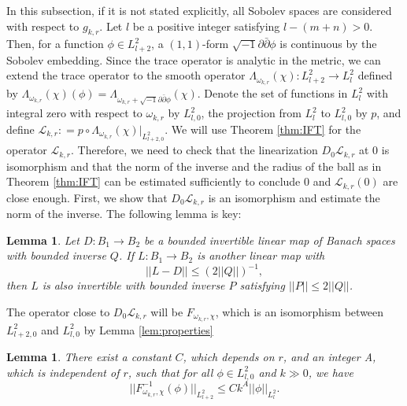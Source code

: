 \documentclass{amsart}
\numberwithin{equation}{section}
\theoremstyle{plain}
\newtheorem{lemma}[equation]{Lemma}
\theoremstyle{definition}
\theoremstyle{remark}
\begin{document}
In this subsection, if it is not stated explicitly, all Sobolev spaces are considered with respect to $g_{k,r}$. Let $l$ be a positive integer satisfying $l-(m+n) > 0$. Then, for a function $\phi \in L^2_{l+2}$,  a $(1,1)$-form $\sqrt{-1} \partial \bar{\partial} \phi$ is continuous by the Sobolev embedding. Since the trace operator is analytic in the metric, we can extend the trace operator to the smooth operator 
$\Lambda_{\omega_{k, r}}(\chi) : L^2_{l+2} \rightarrow L^2_l$ defined by 
$\Lambda_{\omega_{k, r}}(\chi)(\phi) = \Lambda_{\omega_{k, r} + \sqrt{-1} \partial \bar{\partial} \phi}(\chi)$.  
Denote the set of functions in $L^2_l$ with integral zero with respect to $\omega_{k,r}$ by $L^2_{l,0}$,  the projection from $L^2_l$ to $L^2_{l,0}$ by $p$, and define $\mathcal{L}_{k,r} : = p \circ \Lambda_{\omega_{k, r}}(\chi)|_{L^2_{l+2,0}}$.
We will use Theorem \ref{thm:IFT} for the operator $\mathcal{L}_{k,r}$. 
Therefore, we need to check that the linearization $D_0 \mathcal{L}_{k,r}$ at 0 is isomorphism and that the norm of the inverse and the radius of the ball as in Theorem \ref{thm:IFT} can be estimated sufficiently to conclude 0 and $\mathcal{L}_{k,r}(0)$ are close enough.
First, we show that $D_0 \mathcal{L}_{k,r}$ is an isomorphism and estimate the norm of the inverse. The following lemma \cite[Lemma 6.10]{Fine} is key:

\begin{lemma}\label{lem:inverse}
Let $D:B_1\rightarrow B_2$ be a bounded invertible linear map of Banach spaces with bounded inverse $Q$. If $L:B_1\rightarrow B_2$ is another linear map with 
$$||L-D|| \le \left( 2||Q|| \right)^{-1},$$
then $L$ is also invertible with bounded inverse $P$ satisfying $||P|| \le 2||Q||$.
\end{lemma}

The operator close to $D_0 \mathcal{L}_{k,r}$ will be $F_{\omega_{k,r}, \chi}$, which is an isomorphism between $L^2_{l+2,0}$ and $L^2_{l,0}$ by Lemma \ref{lem:properties}

\begin{lemma}\label{lem:inverse_estimate}
There exist a constant $C$, which depends on $r$, and an integer A, which is independent of $r$, 
such that for all $\phi \in L^2_{l,0}$ and $k \gg 0$, we have
$$ ||F_{\omega_{k,r}, \chi}^{-1} (\phi)||_{L^2_{l+2}}
\le Ck^A ||\phi||_{L^2_l}.$$
\end{lemma}
\end{document}

